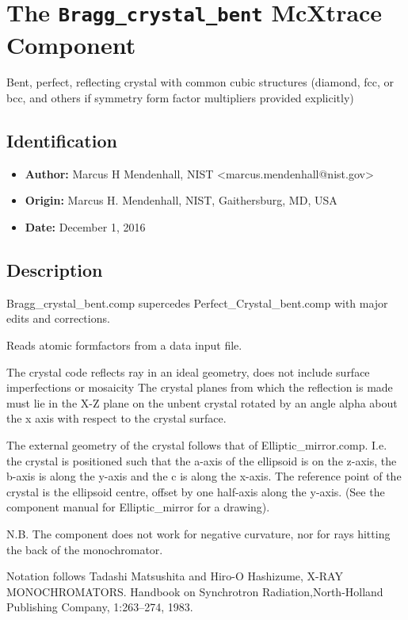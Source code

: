 \section{The \texttt{Bragg\_crystal\_bent} McXtrace Component}
Bent, perfect, reflecting crystal with common cubic structures (diamond, fcc, or bcc, and others if symmetry form factor multipliers provided explicitly)

\subsection*{Identification}
\begin{itemize}
  \item \textbf{Author:} Marcus H Mendenhall, NIST \textless{}marcus.mendenhall@nist.gov\textgreater{}
  \item \textbf{Origin:} Marcus H. Mendenhall, NIST, Gaithersburg, MD, USA
  \item \textbf{Date:} December 1, 2016
\end{itemize}

\subsection*{Description}
Bragg\_crystal\_bent.comp supercedes Perfect\_Crystal\_bent.comp with major edits and corrections.

Reads atomic formfactors from a data input file.

The crystal code reflects ray in an ideal geometry, does not include surface imperfections or mosaicity The crystal planes from which the reflection is made must lie in the X-Z plane on the unbent crystal rotated by an angle alpha about the x axis with respect to the crystal surface.

The external geometry of the crystal follows that of Elliptic\_mirror.comp. I.e. the crystal is positioned such that the a-axis of the ellipsoid is on the z-axis, the b-axis is along the y-axis and the c is along the x-axis. The reference point of the crystal is the ellipsoid centre, offset by one half-axis along the y-axis. (See the component manual for Elliptic\_mirror for a drawing).

N.B. The component does not work for negative curvature, nor for rays hitting the back of the monochromator.

Notation follows Tadashi Matsushita and Hiro-O Hashizume, X-RAY MONOCHROMATORS. Handbook on Synchrotron Radiation,North-Holland Publishing Company, 1:263–274, 1983.

